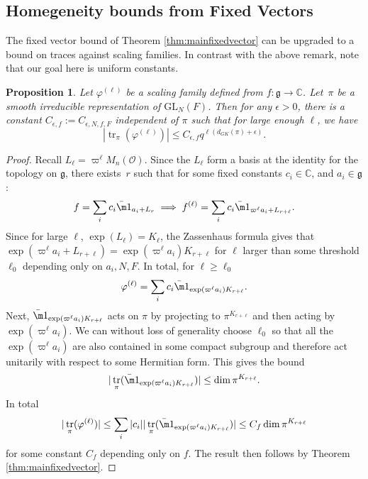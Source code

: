 \documentclass{amsart}
\DeclareMathOperator{\tr}{tr}
\newcommand{\mf}[1]{\mathfrak{#1}}
\newcommand{\mc}[1]{\mathcal{#1}}
\newcommand{\C}{\mathbb C}
\newcommand{\GL}{\mathrm{GL}}
\newcommand{\eps}{\epsilon}
\newcommand{\1}{\m 1}
\newtheorem{prop}[thm]{Proposition}
\theoremstyle{remark}
\theoremstyle{definition}
\numberwithin{equation}{subsection}
\begin{document}
\subsection{Homegeneity bounds from Fixed Vectors}
The fixed vector bound of Theorem \ref{thm:mainfixedvector} can be upgraded to a bound on traces against scaling families. In contrast with the above remark, note that our goal here is uniform constants. 
\begin{prop}\label{prop:scalingtrace}
Let $\varphi^{(\ell)}$ be a scaling family defined from $f : \mf g \to \C$. %
Let~$\pi$ be a smooth irreducible representation of $\GL_N(F)$. Then for any $\epsilon>0$, there is a constant $C_{\eps, f} := C_{\eps, N, f, F}$ independent of $\pi$ such that for large enough $\ell$, we have
\[
|\tr_\pi (\varphi^{(\ell)})| \leq C_{\eps, f} q^{\ell (d_{GK}(\pi) + \eps)}. 
\]
\end{prop}


\begin{proof}
Recall $L_\ell = \varpi^\ell M_n(\mc O)$. Since the $L_\ell$ form a basis at the identity for the topology on $\mf g$, there exists~$r$ such that for some fixed constants $c_i \in \C$, and $a_i \in \mf g$:
\[
f = \sum_i c_i \bar \1_{a_i+L_r} \implies f^{(\ell)} = \sum_i c_i \bar \1_{\varpi^\ell a_i + L_{r + \ell}}.
\]
Since for large $\ell$, $\exp(L_\ell) = K_\ell$, the Zassenhaus formula gives that $\exp(\varpi^\ell a_i + L_{r + \ell}) = \exp(\varpi^\ell a_i) K_{r+\ell}$ for $\ell$ larger than some threshold $\ell_0$ depending only on $a_i,N,F$. In total, for $\ell \geq \ell_0$
\[
\varphi^{(\ell)} = \sum_i c_i \bar \1_{\exp(\varpi^\ell a_i) K_{r+\ell}}. 
\]
Next, $\bar \1_{\exp(\varpi^\ell a_i) K_{r+\ell}}$ acts on $\pi$ by projecting to $\pi^{K_{r + \ell}}$ and then acting by $\exp(\varpi^\ell a_i)$. We can without loss of generality choose $\ell_0$ so that all the $\exp(\varpi^\ell a_i)$ are also contained in some compact subgroup and therefore act unitarily with respect to some Hermitian form. This gives the bound
\[
|\tr_\pi (\bar \1_{\exp(\varpi^\ell a_i) K_{r+\ell}})| \leq \dim \pi^{K_{r+\ell}}. 
\]
In total
\[
|\tr_\pi(\varphi^{(\ell)})| \leq \sum_i |c_i| |\tr_\pi (\bar \1_{\exp(\varpi^\ell a_i) K_{r+\ell}}) | \leq C_f \dim \pi^{K_{r+\ell}}
\]
for some constant $C_f$ depending only on $f$. The result then follows by Theorem \ref{thm:mainfixedvector}.
\end{proof}
\end{document}

